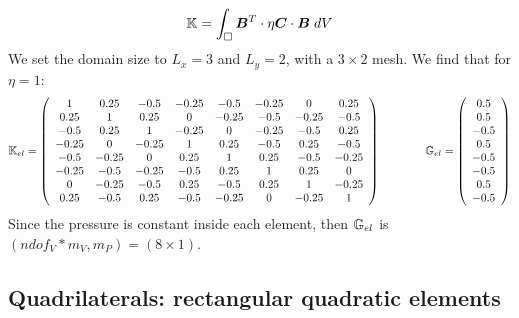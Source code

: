 \[
{\mathbb{K}} = \int_\square {\bm B}^T \cdot \eta {\bm C} \cdot {\bm B} \; dV 
\]
We set the domain size to $L_x=3$ and $L_y=2$, with a $3\times 2$ mesh.
We find that for $\eta=1$: 
\[
{\mathbb{K}}_{el}=
\left(
\begin{array}{cccccccc}
1    & 0.25 & -0.5 & -0.25 & -0.5  & -0.25 & 0     & 0.25 \\
0.25 & 1    & 0.25 & 0     & -0.25 & -0.5  & -0.25 & -0.5 \\
-0.5 & 0.25 & 1    & -0.25 &     0 & -0.25 & - 0.5 & 0.25 \\
-0.25 & 0 & -0.25 & 1 & 0.25 & -0.5 & 0.25 & -0.5 \\
-0.5 & -0.25 & 0 & 0.25 & 1 & 0.25 & -0.5 & -0.25 \\
-0.25 & -0.5 & -0.25 & -0.5 & 0.25 & 1 & 0.25 & 0 \\
0 & -0.25 & -0.5 & 0.25 & -0.5 & 0.25 & 1 & -0.25 \\
0.25 & -0.5 & 0.25 & -0.5 & -0.25 & 0 & -0.25 & 1 
\end{array}
\right)
\qquad
\qquad
{\mathbb{G}}_{el} = 
\left(
\begin{array}{c}
 0.5 \\
 0.5 \\
-0.5 \\
 0.5 \\
-0.5 \\
-0.5 \\
 0.5 \\
-0.5
\end{array}
\right)
\]
Since the pressure is constant inside each element, then ${\mathbb{G}}_{el}$ is $(ndof_V*m_V,m_P)=(8\times 1)$.



\subsection{Quadrilaterals: rectangular quadratic elements} \label{app:qrqe}




